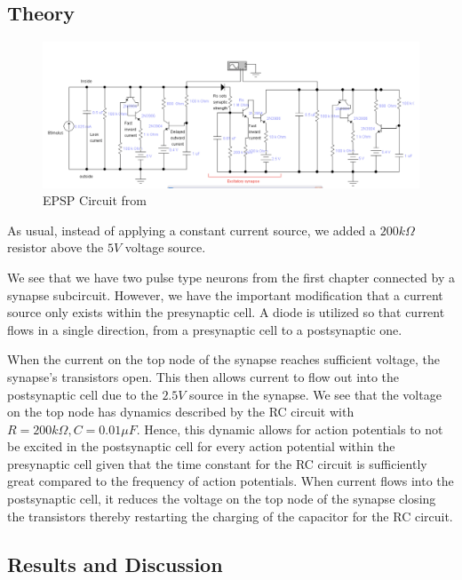 \documentclass[12]{book}
\newcommand\0{\mathbf{0}}
\newcommand\<{\langle}
\renewcommand\>{\rangle}
\begin{document}
\subsection{Theory}

\begin{figure}[H]
\centering
\includegraphics[width=\textwidth]{excitatory_circuit}	
\caption{EPSP Circuit from \cite{levitan2015neuron}}
\end{figure}

As usual, instead of applying a constant current source, we added a $200k\Omega$ resistor above the $5V$ voltage source.

We see that we have two pulse type neurons from the first chapter connected by a synapse subcircuit. However, we have the important modification that a current source only exists within the presynaptic cell. A diode is utilized so that current flows in a single direction, from a presynaptic cell to a postsynaptic one.  

When the current on the top node of the synapse reaches sufficient voltage, the synapse's transistors open. This then allows current to flow out into the postsynaptic cell due to the $2.5V$ source in the synapse. We see that the voltage on the top node has dynamics described by the RC circuit with $R=200 k \Omega, C = 0.01 \mu F$. Hence, this dynamic allows for action potentials to not be excited in the postsynaptic cell for every action potential within the presynaptic cell given that the time constant for the RC circuit is sufficiently great compared to the frequency of action potentials. When current flows into the postsynaptic cell, it reduces the voltage on the top node of the synapse closing the transistors thereby restarting the charging of the capacitor for the RC circuit.

\subsection{Results and Discussion}
\end{document}
